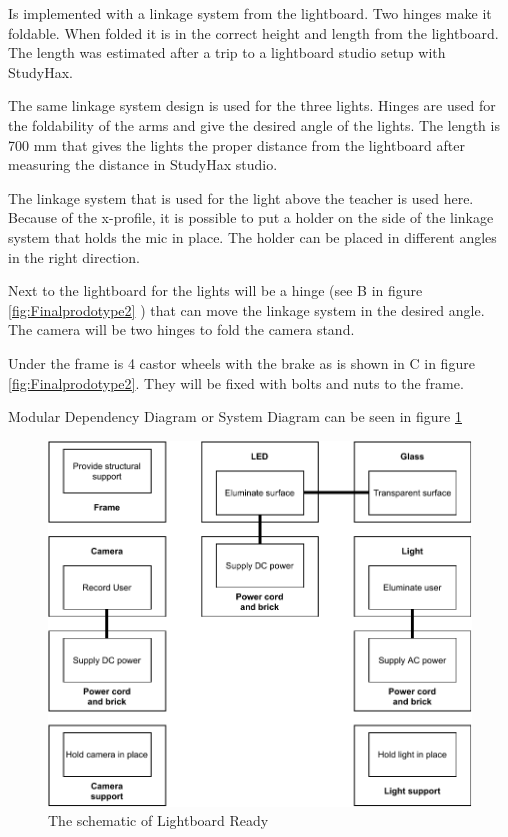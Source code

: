 \documentclass[a4paper]{jpconf}
\begin{document}
\textbf{} Is implemented with a linkage system from the lightboard.
Two hinges make it foldable.
When folded it is in the correct height and length from the lightboard.
The length was estimated after a trip to a lightboard studio setup with StudyHax.

\textbf{} The same linkage system design is used for the three lights.
Hinges are used for the foldability of the arms and give the desired angle of the lights.
The length is 700 mm that gives the lights the proper distance from the lightboard after measuring the distance in StudyHax studio.

\textbf{} The linkage system that is used for the light above the teacher is used here.
Because of the x-profile, it is possible to put a holder on the side of the linkage system that holds the mic in place.
The holder can be placed in different angles in the right direction.

\textbf{} Next to the lightboard for the lights will be a hinge (see B in figure \ref{fig:Finalprodotype2} ) that can move the linkage system in the desired angle.
The camera will be two hinges to fold the camera stand.

\textbf{} Under the frame is 4 castor wheels with the brake as is shown in C in figure \ref{fig:Finalprodotype2}.
They will be fixed with bolts and nuts to the frame.

Modular Dependency Diagram or System Diagram can be seen in figure \ref{fig:scematic}
\begin{figure}
	\centering
	\includegraphics[width=1\linewidth]{scematic.pdf}
	\caption{The schematic of Lightboard Ready}
	\label{fig:scematic}
\end{figure}
\end{document}

